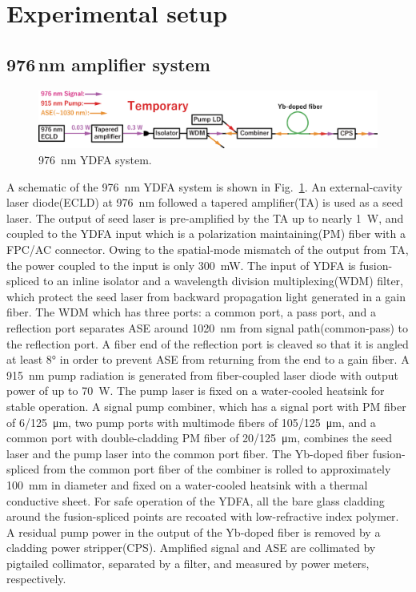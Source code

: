 \documentclass{osa-article}
\begin{document}
\section{Experimental setup}
\subsection{976\,nm amplifier system}

\begin{figure}[h!]
  \centering\includegraphics[width=\linewidth]{./Figure/976nmYDFASystem.eps}
  \caption{\SI{976}{\nm} YDFA system.}
  \label{fig:976YDFASystem}
\end{figure}

A schematic of the \SI{976}{\nm} YDFA system is shown in Fig.~\ref{fig:976YDFASystem}.
An external-cavity laser diode(ECLD) at \SI{976}{\nm} followed a tapered amplifier(TA) is used as a seed laser.
The output of seed laser is pre-amplified by the TA up to nearly \SI{1}{\W}, and coupled to the YDFA input which is a polarization maintaining(PM) fiber with a FPC/AC connector.
Owing to the spatial-mode mismatch of the output from TA, the power coupled to the input is only \SI{300}{\mW}.
The input of YDFA is fusion-spliced to an inline isolator and a wavelength division multiplexing(WDM) filter, which protect the seed laser from backward propagation light generated in a gain fiber.
The WDM which has three ports: a common port, a pass port, and a reflection port separates ASE around \SI{1020}{\nm} from signal path(common-pass) to the reflection port.
A fiber end of the reflection port is cleaved so that it is angled at least \ang{8} in order to prevent ASE from returning from the end to a gain fiber.
A \SI{915}{\nm} pump radiation is generated from fiber-coupled laser diode with output power of up to \SI{70}{\W}.
The pump laser is fixed on a water-cooled heatsink for stable operation.
A signal pump combiner, which has a signal port with PM fiber of \SI{6/125}{\um}, two pump ports with multimode fibers of \SI{105/125}{\um}, and a common port with double-cladding PM fiber of \SI{20/125}{\um}, combines the seed laser and the pump laser into the common port fiber.
The Yb-doped fiber fusion-spliced from the common port fiber of the combiner is rolled to approximately \SI{100}{\mm} in diameter and fixed on a water-cooled heatsink with a thermal conductive sheet.
For safe operation of the YDFA, all the bare glass cladding around the fusion-spliced points are recoated with low-refractive index polymer.
A residual pump power in the output of the Yb-doped fiber is removed by a cladding power stripper(CPS).
Amplified signal and ASE are collimated by pigtailed collimator, separated by a filter, and measured by power meters, respectively.
\end{document}

